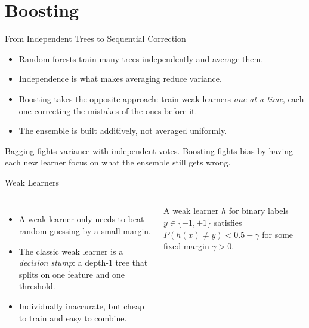 \section{Boosting}

\begin{frame}{From Independent Trees to Sequential Correction}
\begin{itemize}
  \item Random forests train many trees independently and average them.
  \pause
  \item Independence is what makes averaging reduce variance.
  \pause
  \item Boosting takes the opposite approach: train weak learners \emph{one at a time}, each one correcting the mistakes of the ones before it.
  \pause
  \item The ensemble is built additively, not averaged uniformly.
\end{itemize}

\pause
\begin{rlintuition}
Bagging fights variance with independent votes. Boosting fights bias by having each new learner focus on what the ensemble still gets wrong.
\end{rlintuition}
\end{frame}

\begin{frame}{Weak Learners}
\begin{columns}[T]
\begin{itemize}
  \item A weak learner only needs to beat random guessing by a small margin.
  \pause
  \item The classic weak learner is a \emph{decision stump}: a depth-1 tree that splits on one feature and one threshold.
  \pause
  \item Individually inaccurate, but cheap to train and easy to combine.
\end{itemize}

\pause
{}
\begin{rldefinition}
A weak learner $h$ for binary labels $y\in\{-1,+1\}$ satisfies
$P(h(x)\neq y) < 0.5 - \gamma$ for some fixed margin $\gamma > 0$.
\end{rldefinition}
\end{columns}
\end{frame}

